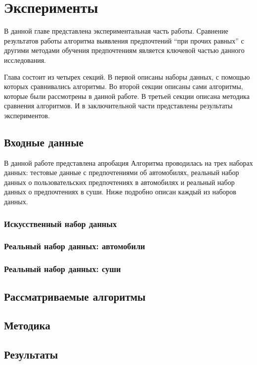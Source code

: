 \chapter{Эксперименты}
\label{chapter:experiments}
В данной главе представлена экспериментальная часть работы. Сравнение результатов работы алгоритма выявления предпочтений \enquote{при прочих равных} с другими методами обучения предпочтениям является ключевой частью данного исследования.

Глава состоит из четырех секций. В первой описаны наборы данных, с помощью которых сравнивались алгоритмы. Во второй секции описаны сами алгоритмы, которые были рассмотрены в данной работе. В третьей секции описана методика сравнения алгоритмов. И в заключительной части представлены результаты экспериментов.

\section{Входные данные}
	В данной работе представлена
	апробация Алгоритма проводилась на трех наборах данных: тестовые данные с предпочтениями об автомобилях, реальный набор данных о пользовательских предпочтениях в автомобилях %
	и реальный набор данных о предпочтениях в суши. Ниже подробно описан каждый из наборов данных.
	
	\subsection{Искусственный набор данных}
	\subsection{Реальный набор данных: автомобили}
	\subsection{Реальный набор данных: суши}
	
\section{Рассматриваемые алгоритмы}

\section{Методика}

\section{Результаты}